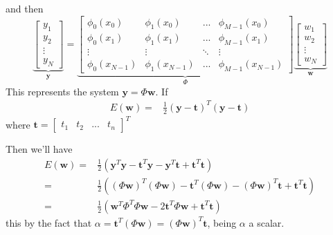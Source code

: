 \begin{frame}{\insertsubsection}
%
and then
%
\begin{equation*}
\underbrace{
\begin{bmatrix}
y_1 \\ y_2 \\  \vdots \\ y_N
\end{bmatrix}
}_\mathbf{y} = 
\underbrace{
\begin{bmatrix}
\phi_0(x_0) & \phi_1(x_0) & ... & \phi_{M-1}(x_0)   \\ 
\phi_0(x_1) & \phi_1(x_1) & ... & \phi_{M-1}(x_1)    \\ 
\vdots & \vdots & \ddots & \vdots \\
\phi_0(x_{N-1}) & \phi_1(x_{N-1}) & ... & \phi_{M-1}(x_{N-1})  
\end{bmatrix}
}_\Phi
\underbrace{
\begin{bmatrix}
w_1 \\ w_2 \\  \vdots \\ w_N
\end{bmatrix}
}_\mathbf{w}
\end{equation*}
This represents the system $\mathbf{y} = \Phi \mathbf{w}$. If
\begin{align*}
E(\mathbf{w}) =& \frac{1}{2} \left( \mathbf{y} - \mathbf{t} \right)^T\left( \mathbf{y} - \mathbf{t} \right)
\end{align*}
where $\mathbf{t} =
\begin{bmatrix}
t_1 & t_2 & ... & t_n
\end{bmatrix}^T
$
\end{frame}

\begin{frame}{\insertsubsection}
%
Then we'll have 
%
\begin{align*}
E(\mathbf{w}) =& \frac{1}{2} \left( \mathbf{y}^T\mathbf{y} -  \mathbf{t}^T\mathbf{y} - \mathbf{y}^T\mathbf{t} + \mathbf{t}^T\mathbf{t} \right) \\
		   =& \frac{1}{2} \left( ( \Phi \mathbf{w})^T( \Phi \mathbf{w}) -  \mathbf{t}^T( \Phi \mathbf{w}) - ( \Phi \mathbf{w})^T\mathbf{t} + \mathbf{t}^T\mathbf{t} \right) \\
		   =& \frac{1}{2} \left( \mathbf{w}^T \Phi^T \Phi \mathbf{w} -  2\mathbf{t}^T \Phi \mathbf{w} + \mathbf{t}^T\mathbf{t} \right)
\end{align*}
this by the fact that $\alpha =  \mathbf{t}^T( \Phi \mathbf{w}) = ( \Phi \mathbf{w})^T\mathbf{t}$, being $\alpha$ a scalar.

\end{frame}

